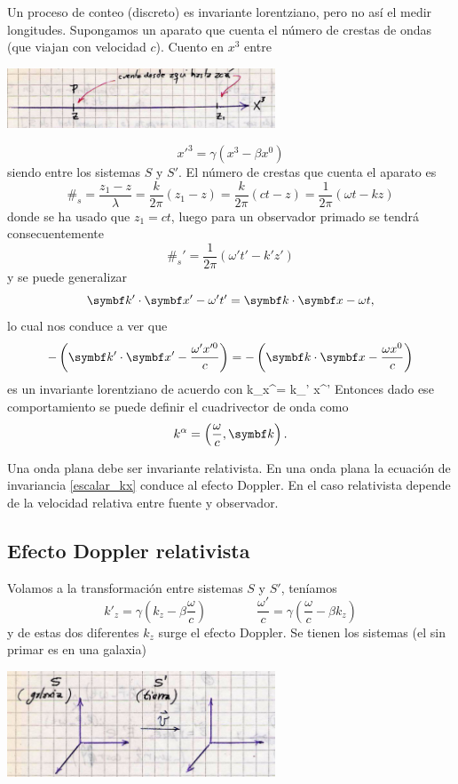 \documentclass[10pt,oneside]{CBFT_book}
\begin{document}
Un proceso de conteo (discreto) es invariante lorentziano, pero no así el medir
longitudes.
Supongamos un aparato que cuenta el número de crestas de ondas (que viajan con velocidad
$c$).
Cuento en $x^3$ entre

\includegraphics[width=0.6\textwidth]{images/fig_ft1_sr_ondas.jpg}

\[
	x'^3 = \gamma ( x^3 - \beta x^0 )
\]
siendo  entre los sistemas $S$ y $S'$.
El número de crestas que cuenta el aparato es 
\[
	\#_s = \frac{ z_1 - z }{ \lambda } = \frac{ k }{ 2\pi }( z_1 - z ) = \frac{ k }{ 2\pi }( ct - z ) = 
	\frac{ 1 }{ 2\pi }( \omega t - kz )
\]
donde se ha usado que $z_1 = ct $, luego para un observador primado se tendrá consecuentemente
\[
	\#_s' = \frac{ 1 }{ 2\pi }( \omega' t' - k'z' )
\]
y se puede generalizar
\[
	\pe{k'}{x'} - \omega' t' = \pe{k}{x} - \omega t,
\]
lo cual nos conduce a ver que
\[
	-\left( \pe{k'}{x'} - \frac{\omega' x'^0 }{c} \right) = 
	-\left( \pe{k}{x} - \frac{\omega x^0 }{c}  \right)
\]
es un invariante lorentziano de acuerdo con
\be
	k_\alpha x^\alpha = k_{\alpha}' x^{'\alpha}
	\label{escalar_kx}
\ee
Entonces dado ese comportamiento se puede definir el cuadrivector de onda como
\[
	k^\alpha = \left( \frac{\omega}{c}, \vb{k}\right).
\]

Una onda plana debe ser invariante relativista. En una onda plana la ecuación de invariancia
\eqref{escalar_kx} conduce al efecto Doppler. En el caso relativista depende de la velocidad
relativa entre fuente y observador.

\subsection{Efecto Doppler relativista}

Volamos a la transformación entre sistemas $S$ y $S'$, teníamos
\[
	k'_z = \gamma \left( k_z - \beta \frac{\omega}{c} \right) \qquad \qquad 
	\frac{\omega'}{c}  = \gamma \left( \frac{\omega}{c} - \beta k_z \right)
\]
y de estas dos diferentes $k_z$ surge el efecto Doppler.
Se tienen los sistemas (el sin primar es en una galaxia)

\includegraphics[width=0.6\textwidth]{images/fig_ft1_sperel_doppler1.jpg}
\end{document}
